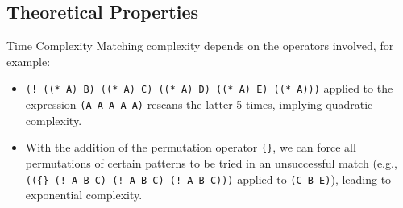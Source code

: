 \documentclass[8pt]{beamer}
\begin{document}
\subsection{Theoretical Properties}
\begin{frame}{Time Complexity} 
Matching complexity depends on the operators involved, for example: 
\begin{itemize}
\item \texttt{(!~((* A) B) ((* A) C) ((* A) D) ((* A) E) ((* A)))}  applied to the expression \texttt{(A A A A A)} rescans the latter 5 times, implying quadratic complexity.  
\item  With the addition of the permutation operator \texttt{\{\}}, we can force all permutations of certain patterns to be tried in an unsuccessful match (e.g., \texttt{((\{\} (!~A B C) (!~A B C) (!~A B C)))} applied to \texttt{(C B E)}), leading to exponential complexity. 
\end{itemize}
\end{frame}
\end{document}
